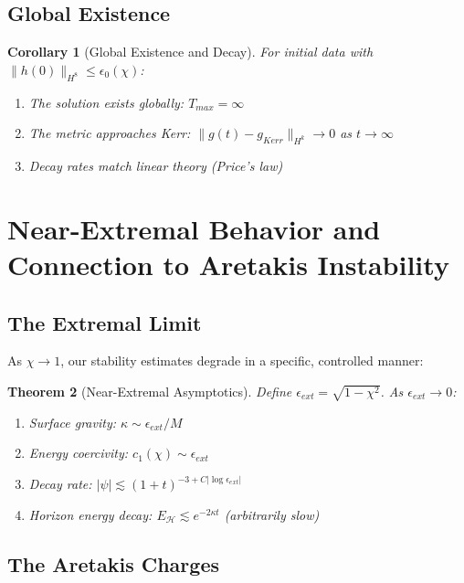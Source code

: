 \documentclass[12pt,a4paper]{article}
\newtheorem{theorem}{Theorem}[section]
\newtheorem{corollary}[theorem]{Corollary}
\begin{document}
\subsection{Global Existence}

\begin{corollary}[Global Existence and Decay]
For initial data with $\|h(0)\|_{H^8} \leq \epsilon_0(\chi)$:
\begin{enumerate}[label=(\roman*)]
    \item The solution exists globally: $T_{max} = \infty$
    \item The metric approaches Kerr: $\|g(t) - g_{Kerr}\|_{H^k} \to 0$ as $t \to \infty$
    \item Decay rates match linear theory (Price's law)
\end{enumerate}
\end{corollary}

\section{Near-Extremal Behavior and Connection to Aretakis Instability}

\subsection{The Extremal Limit}

As $\chi \to 1$, our stability estimates degrade in a specific, controlled manner:

\begin{theorem}[Near-Extremal Asymptotics]\label{thm:near-extremal}
Define $\epsilon_{ext} = \sqrt{1-\chi^2}$. As $\epsilon_{ext} \to 0$:
\begin{enumerate}[label=(\roman*)]
    \item Surface gravity: $\kappa \sim \epsilon_{ext}/M$
    \item Energy coercivity: $c_1(\chi) \sim \epsilon_{ext}$
    \item Decay rate: $|\psi| \lesssim (1+t)^{-3+C|\log\epsilon_{ext}|}$
    \item Horizon energy decay: $E_{\mathcal{H}} \lesssim e^{-2\kappa t}$ (arbitrarily slow)
\end{enumerate}
\end{theorem}

\subsection{The Aretakis Charges}
\end{document}

